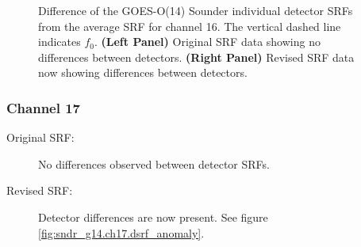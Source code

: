 \begin{figure}[htp]
\begin{tabular}{c c}
  \end{tabular}
  \caption{Difference of the GOES-O(14) Sounder individual detector SRFs from the average SRF for channel 16. The vertical dashed line indicates $f_0$. \textbf{(Left Panel)} Original SRF data showing no differences between detectors. \textbf{(Right Panel)} Revised SRF data now showing differences between detectors.}
  \label{fig:sndr_g14.ch16.dsrf_anomaly}
\end{figure}


\subsubsection{Channel 17}
\begin{description}
  \item[Original SRF:] No differences observed between detector SRFs.
  \item[Revised SRF:]  Detector differences are now present. See figure \ref{fig:sndr_g14.ch17.dsrf_anomaly}.
\end{description}

